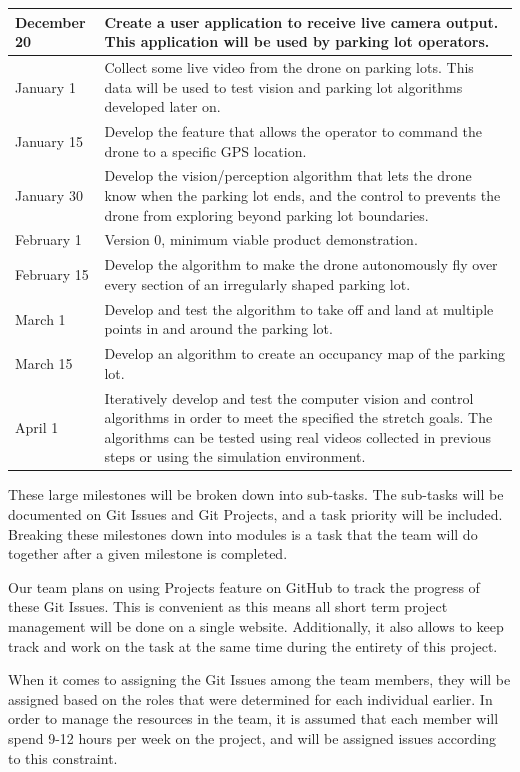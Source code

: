 \documentclass{article}
\begin{document}
\begin{table}[h]
\begin{center}
\begin{tabular}{ | m{2cm} | m{11cm} | }
\hline
December 20 & Create a user application to receive live camera output. This application will be used by parking lot operators.\\

\hline
January 1 & Collect some live video from the drone on parking lots. This data will be used to test vision and parking lot algorithms developed later on.\\

\hline
January 15 & Develop the feature that allows the operator to command the drone to a specific GPS location.\\

\hline
January 30 & Develop the vision/perception algorithm that lets the drone know when the parking lot ends, and the control to prevents the drone from exploring beyond parking lot boundaries.\\

\hline
February 1 & Version 0, minimum viable product demonstration. \\

\hline
February 15 & Develop the algorithm to make the drone autonomously fly over every section of an irregularly shaped parking lot. \\

\hline
March 1 & Develop and test the algorithm to take off and land at multiple points in and around the parking lot. \\

\hline
March 15 & Develop an algorithm to create an occupancy map of the parking lot. \\

\hline
April 1 & Iteratively develop and test the computer vision and control algorithms in order to meet the specified the stretch goals. The algorithms can be tested using real videos collected in previous steps or using the simulation environment.\\
\hline

\end{tabular}
\end{center}
\end{table}

These large milestones will be broken down into sub-tasks. The sub-tasks will be documented on Git Issues and Git Projects, and a task priority will be included. Breaking these milestones down into modules is a task that the team will do together after a given milestone is completed. 

Our team plans on using Projects feature on GitHub to track the progress of these Git Issues. This is convenient as this means all short term project management will be done on a single website. Additionally, it also allows to keep track and work on the task at the same time during the entirety of this project.

When it comes to assigning the Git Issues among the team members, they will be assigned based on the roles that were determined for each individual earlier. In order to manage the resources in the team, it is assumed that each member will spend 9-12 hours per week on the project, and will be assigned issues according to this constraint.
\end{document}
